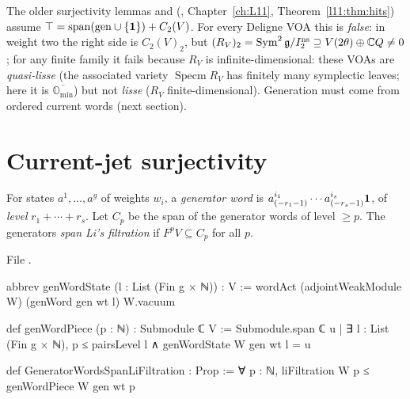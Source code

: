 \begin{warning}[title={Dead end: the ``span plus $C_2$'' generation criterion}]
The older surjectivity lemmas  and
 (,
Chapter~\ref{ch:L11}, Theorem~\ref{l11:thm:hits}) assume
$\top=\operatorname{span}(\mathrm{gen}\cup\{\mathbf 1\})+C_2(V)$. For every Deligne VOA this is
\emph{false}: in weight two the right side is $C_2(V)_2$, but $(R_V)_2=\operatorname{Sym}^2\mathfrak g/I_2^{\mathrm{ns}}\supseteq
V(2\theta)\oplus{\mathbb{C}} Q\neq0$; for any finite family it fails because $R_V$ is infinite-dimensional: these VOAs are
\emph{quasi-lisse} (the associated variety $\operatorname{Specm}R_V$ has finitely many symplectic leaves; here it is
$\overline{\mathbb O_{\min}}$) but not \emph{lisse} ($R_V$ finite-dimensional). Generation must come from ordered current
words (next section).
\end{warning}

\section{Current-jet surjectivity}\label{l24:sec:jets}

\begin{definition}\label{l24:def:genword}
For states $a^1,\dots,a^g$ of weights $w_i$, a \emph{generator word} is
$a^{i_1}_{(-r_1-1)}\cdots a^{i_s}_{(-r_s-1)}\mathbf 1$, of \emph{level} $r_1+\cdots+r_s$. Let $C_p$ be the span of
the generator words of level $\ge p$. The generators \emph{span Li's filtration} if $F^pV\subseteq C_p$ for
all $p$.
\end{definition}
\noindent File .
\begin{leancode}
abbrev genWordState (l : List (Fin g × ℕ)) : V :=
  wordAct (adjointWeakModule W) (genWord gen wt l) W.vacuum

def genWordPiece (p : ℕ) : Submodule ℂ V :=
  Submodule.span ℂ {u | ∃ l : List (Fin g × ℕ), p ≤ pairsLevel l ∧ genWordState W gen wt l = u}

def GeneratorWordsSpanLiFiltration : Prop :=
  ∀ p : ℕ, liFiltration W p ≤ genWordPiece W gen wt p
\end{leancode}

